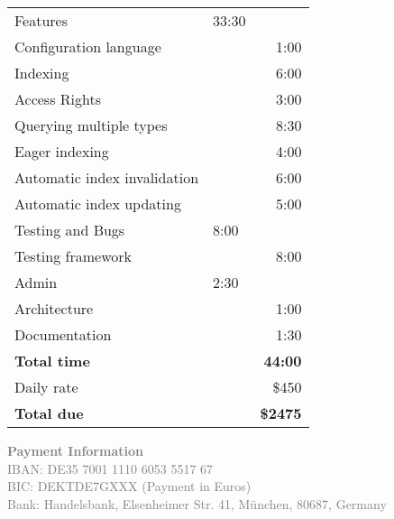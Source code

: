 \documentclass[11pt]{article}
\begin{document}
\begin{table}[htb]
\centering

\begin{tabular}{llr}

\hline

Features & 33:30 & \\
\hspace*{1em} Configuration language &  & 1:00\\
\hspace*{1em} Indexing &  & 6:00\\
\hspace*{1em} Access Rights &  & 3:00\\
\hspace*{1em} Querying multiple types &  & 8:30\\
\hspace*{1em} Eager indexing &  & 4:00\\
\hspace*{1em} Automatic index invalidation &  & 6:00\\
\hspace*{1em} Automatic index updating &  & 5:00\\
Testing and Bugs & 8:00 & \\
\hspace*{1em} Testing framework &  & 8:00\\
Admin & 2:30 & \\
\hspace*{1em} Architecture &  & 1:00\\
\hspace*{1em} Documentation &  & 1:30\\
\hline
\textbf{Total time} & & \textbf{44:00} \\

Daily rate & & \$450 \\

\textbf{Total due} & & \textbf{\$2475} \\
\end{tabular}
\end{table}

\vspace{\fill}



\textcolor{gray}{\small
\textbf{Payment Information}\\
IBAN: DE35 7001 1110 6053 5517 67 \\
BIC: DEKTDE7GXXX  (Payment in Euros) \\
Bank: Handelsbank, Elsenheimer Str. 41, München, 80687, Germany
}
\end{document}
